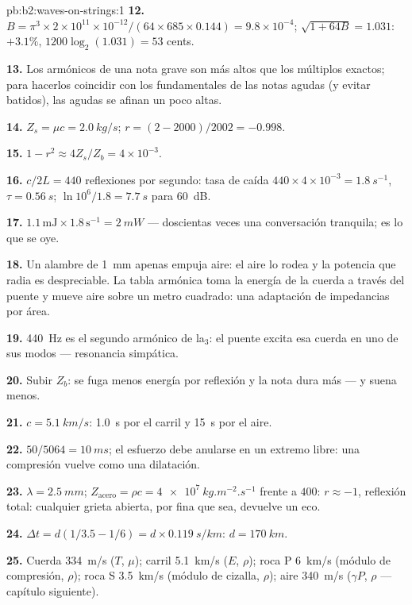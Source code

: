 \begin{solution}{pb:b2:waves-on-strings:1}
\textbf{12.} $B = \pi^3 \times 2 \times 10^{11} \times 10^{-12}/(64 \times 685 \times 0.144) =
9.8 \times 10^{-4}$; $\sqrt{1 + 64B} = 1.031$: $+3.1\%$, $1200\log_2(1.031) = 53$ cents.

\textbf{13.} Los armónicos de una nota grave son más altos que los
múltiplos exactos; para hacerlos coincidir con los fundamentales de las
notas agudas (y evitar batidos), las agudas se afinan un poco altas.

\textbf{14.} $Z_s = \mu c = \qty{2.0}{kg/s}$; $r = (2 - 2000)/2002 = -0.998$.

\textbf{15.} $1 - r^2 \approx 4Z_s/Z_b = 4 \times 10^{-3}$.

\textbf{16.} $c/2L = 440$ reflexiones por segundo: tasa de caída $440 \times 4 \times
10^{-3} = \qty{1.8}{s^{-1}}$, $\tau = \qty{0.56}{s}$; $\ln10^6/1.8 = \qty{7.7}{s}$ para
\qty{60}{dB}.

\textbf{17.} $1.1\,\text{mJ} \times 1.8\,\text{s}^{-1} = \qty{2}{mW}$ --- doscientas
veces una conversación tranquila; es lo que se oye.

\textbf{18.} Un alambre de \qty{1}{mm} apenas empuja aire: el aire lo
rodea y la potencia que radia es despreciable. La tabla armónica toma la
energía de la cuerda a través del puente y mueve aire sobre un metro
cuadrado: una adaptación de impedancias por área.

\textbf{19.} \qty{440}{Hz} es el segundo armónico de la$_3$: el puente
excita esa cuerda en uno de sus modos --- resonancia simpática.

\textbf{20.} Subir $Z_b$: se fuga menos energía por reflexión y la nota
dura más --- y suena menos.

\textbf{21.} $c = \qty{5.1}{km/s}$: \qty{1.0}{s} por el carril y \qty{15}{s} por el aire.

\textbf{22.} $50/5064 = \qty{10}{ms}$; el esfuerzo debe anularse en un
extremo libre: una compresión vuelve como una dilatación.

\textbf{23.} $\lambda = \qty{2.5}{mm}$; $Z_{\text{acero}} = \rho c = \qty{4e7}{kg.m^{-2}.s^{-1}}$
frente a $400$: $r \approx -1$, reflexión total: cualquier grieta abierta,
por fina que sea, devuelve un eco.

\textbf{24.} $\Delta t = d(1/3.5 - 1/6) = d \times \qty{0.119}{s/km}$: $d = \qty{170}{km}$.

\textbf{25.} Cuerda \qty{334}{m/s} ($T$, $\mu$); carril \qty{5.1}{km/s} ($E$, $\rho$);
roca P \qty{6}{km/s} (módulo de compresión, $\rho$); roca S \qty{3.5}{km/s}
(módulo de cizalla, $\rho$); aire \qty{340}{m/s} ($\gamma P$, $\rho$ --- capítulo siguiente).
\end{solution}

